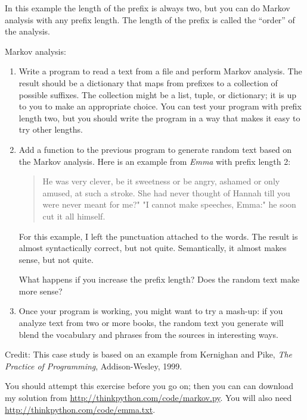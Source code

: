 \documentclass[10pt]{book}
\begin{document}
In this example the length of the prefix is always two, but
you can do Markov analysis with any prefix length.  The length
of the prefix is called the ``order'' of the analysis.

\begin{exercise}

Markov analysis:

\begin{enumerate}

\item Write a program to read a text from a file and perform Markov
analysis.  The result should be a dictionary that maps from
prefixes to a collection of possible suffixes.  The collection
might be a list, tuple, or dictionary; it is up to you to make
an appropriate choice.  You can test your program with prefix
length two, but you should write the program in a way that makes
it easy to try other lengths.

\item Add a function to the previous program to generate random text
based on the Markov analysis.  Here is an example from {\em Emma}
with prefix length 2:

\begin{quote}
He was very clever, be it sweetness or be angry, ashamed or only
amused, at such a stroke. She had never thought of Hannah till you
were never meant for me?" "I cannot make speeches, Emma:" he soon cut
it all himself.
\end{quote}

For this example, I left the punctuation attached to the words.
The result is almost syntactically correct, but not quite.
Semantically, it almost makes sense, but not quite.

What happens if you increase the prefix length?  Does the random
text make more sense?

\item Once your program is working, you might want to try a mash-up:
if you analyze text from two or more books, the random
text you generate will blend the vocabulary and phrases from
the sources in interesting ways.

\end{enumerate}

Credit: This case study is based on an example from Kernighan and
Pike, {\em The Practice of Programming}, Addison-Wesley, 1999.

\end{exercise}

You should attempt this exercise before you go on; then you can can
download my solution from \url{http://thinkpython.com/code/markov.py}.  You
will also need \url{http://thinkpython.com/code/emma.txt}.
\end{document}
